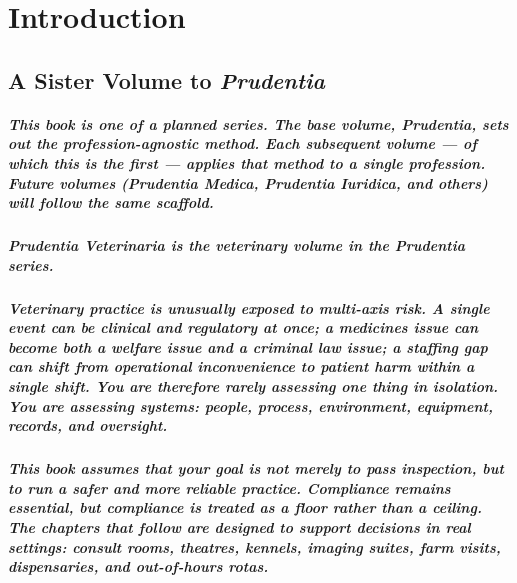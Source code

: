 \chapter{Introduction}
\label{chap:Introduction}

\section{A Sister Volume to \textit{Prudentia}}

\paragraph{This book is one of a planned series. The base volume, \textit{Prudentia}, sets out the profession-agnostic method. Each subsequent volume --- of which this is the first --- applies that method to a single profession. Future volumes (\textit{Prudentia Medica}, \textit{Prudentia Iuridica}, and others) will follow the same scaffold.}

\paragraph{\textit{Prudentia Veterinaria} is the veterinary volume in the \textit{Prudentia} series.}

\paragraph{Veterinary practice is unusually exposed to multi-axis risk. A single event can be clinical and regulatory at once; a medicines issue can become both a welfare issue and a criminal law issue; a staffing gap can shift from operational inconvenience to patient harm within a single shift. You are therefore rarely assessing one thing in isolation. You are assessing systems: people, process, environment, equipment, records, and oversight.}

\paragraph{This book assumes that your goal is not merely to pass inspection, but to run a safer and more reliable practice. Compliance remains essential, but compliance is treated as a floor rather than a ceiling. The chapters that follow are designed to support decisions in real settings: consult rooms, theatres, kennels, imaging suites, farm visits, dispensaries, and out-of-hours rotas.}

